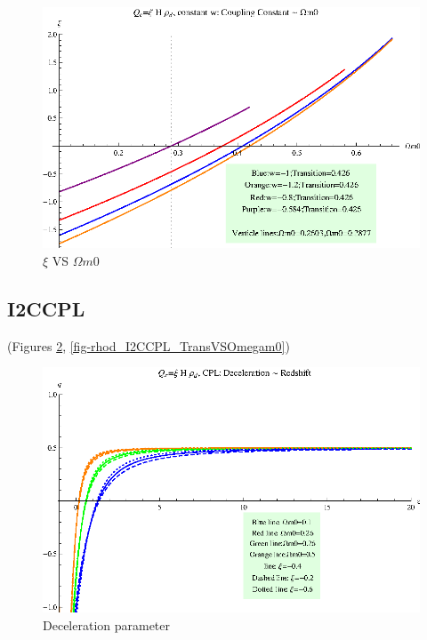 \documentclass[12pt,a4paper]{article}
\begin{document}
\begin{figure}
\centering
\includegraphics[width=500pt]{rhod_I2CC_xiVSOmegam02.eps}
\caption{$\xi$ VS $\Omega m0$}\label{fig-rhod_I2CC_xiVSOmegam02}
\end{figure}





\subsection{I2CCPL}

(Figures \ref{fig-rhod_I2CCPL_DecPara}, \ref{fig-rhod_I2CCPL_TransVSOmegam0})


\begin{figure}
\centering
\includegraphics[width=500pt]{rhod_I2CCPL_DecPara.eps}
\caption{Deceleration parameter}\label{fig-rhod_I2CCPL_DecPara}
\end{figure}
\end{document}

